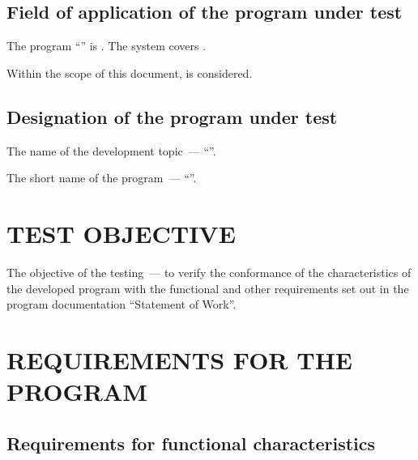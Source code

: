 \documentclass[12pt,a4paper]{extarticle}
\begin{document}
\subsection{Field of application of the program under test}


The program \enquote{\projectname} is . The system covers .

Within the scope of this document,  is considered.

\subsection{Designation of the program under test}

The name of the development topic~--- \enquote{\projectname}.

The short name of the program~--- \enquote{\hseProjectNameShort}.

\clearpage

\section{TEST OBJECTIVE}

The objective of the testing~--- to verify the conformance of the characteristics of the developed program with the functional and other requirements set out in the program documentation \enquote{Statement of Work}.

\clearpage

\section{REQUIREMENTS FOR THE PROGRAM}

\subsection{Requirements for functional characteristics}
\end{document}
